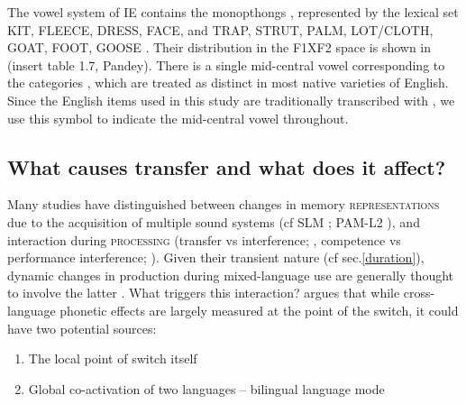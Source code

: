 \documentclass[11pt]{article}
\newcommand{\nt}[1]{\textipa{[#1]}} %
\begin{document}
	The vowel system of IE contains the monopthongs \nt{I, i, E, e, \ae, @/2, a:, O, o, U, u}, represented by the lexical set KIT, FLEECE, DRESS, FACE, and TRAP, STRUT, PALM, LOT/CLOTH, GOAT, FOOT, GOOSE \cite{wells1982accents, masica1972sound}. Their distribution in the F1XF2 space is shown in (insert table 1.7, Pandey). There is a single mid-central vowel corresponding to the categories \nt{2,@,3:}, which are treated as distinct in most native varieties of English. Since the English items used in this study are traditionally transcribed with \nt{2}, we use this symbol to indicate the mid-central vowel throughout. %
	



\subsection{What causes transfer and what does it affect?}

Many studies have distinguished between changes in memory \textsc{representations} due to the acquisition of multiple sound systems (cf SLM ; PAM-L2 ), and interaction during \textsc{processing} (transfer vs interference; , competence vs performance interference; ). 
Given their transient nature (cf sec.\ref{duration}), dynamic changes in production during mixed-language use are generally thought to involve the latter \cite{elias2017effects,simonet2014phonetic}. What triggers this interaction?  argues that while cross-language phonetic effects are largely measured at the point of the switch, it could have two potential sources:
\begin{enumerate}
	\item The local point of switch itself
	\item Global co-activation of two languages -- bilingual language mode \cite{grosjean1998studying} 
\end{enumerate}
\end{document}
